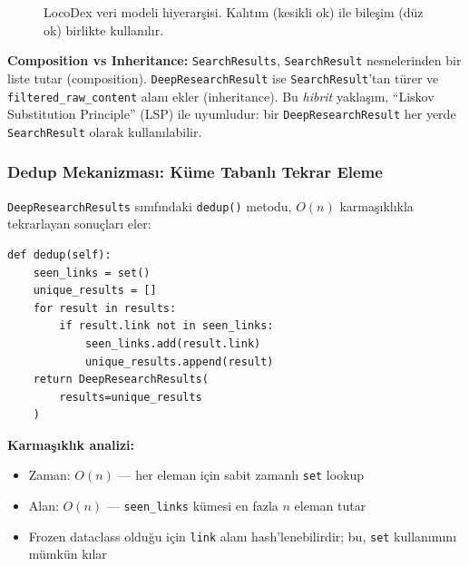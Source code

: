 \begin{figure}[H]
\caption{LocoDex veri modeli hiyerar\c{s}isi. Kal{\i}t{\i}m (kesikli ok) ile bile\c{s}im (d\"{u}z ok) birlikte kullan{\i}l{\i}r.}
\label{fig:data-hierarchy}
\end{figure}

\textbf{Composition vs Inheritance:} \texttt{SearchResults}, \texttt{SearchResult} nesnelerinden bir liste tutar (composition). \texttt{DeepResearchResult} ise \texttt{SearchResult}'tan t\"{u}rer ve \texttt{filtered\_raw\_content} alan{\i} ekler (inheritance). Bu \emph{hibrit} yakla\c{s}{\i}m, ``Liskov Substitution Principle'' (LSP) ile uyumludur: bir \texttt{DeepResearchResult} her yerde \texttt{SearchResult} olarak kullan{\i}labilir.

\subsubsection{Dedup Mekanizmas{\i}: K\"{u}me Tabanl{\i} Tekrar Eleme}

\texttt{DeepResearchResults} s{\i}n{\i}f{\i}ndaki \texttt{dedup()} metodu, $O(n)$ karma\c{s}{\i}kl{\i}kla tekrarlayan sonu\c{c}lar{\i} eler:

\begin{verbatim}
def dedup(self):
    seen_links = set()
    unique_results = []
    for result in results:
        if result.link not in seen_links:
            seen_links.add(result.link)
            unique_results.append(result)
    return DeepResearchResults(
        results=unique_results
    )
\end{verbatim}

\textbf{Karma\c{s}{\i}kl{\i}k analizi:}
\begin{itemize}
  \item Zaman: $O(n)$ --- her eleman i\c{c}in sabit zamanl{\i} \texttt{set} lookup
  \item Alan: $O(n)$ --- \texttt{seen\_links} k\"{u}mesi en fazla $n$ eleman tutar
  \item Frozen dataclass oldu\u{g}u i\c{c}in \texttt{link} alan{\i} hash'lenebilirdir; bu, \texttt{set} kullan{\i}m{\i}n{\i} m\"{u}mk\"{u}n k{\i}lar
\end{itemize}

